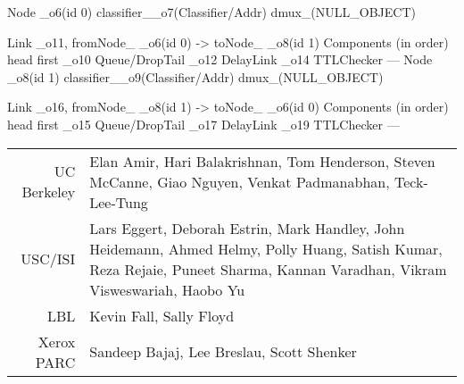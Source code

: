 \documentclass[landscape]{foils}
\begin{document}
\begin{program}
Node _o6(id 0)
                classifier__o7(Classifier/Addr)
                dmux_(NULL_OBJECT)

        Link _o11, fromNode_ _o6(id 0) -> toNode_ _o8(id 1)
        Components (in order) head first
                _o10    Queue/DropTail
                _o12    DelayLink
                _o14    TTLChecker
---
Node _o8(id 1)
                classifier__o9(Classifier/Addr)
                dmux_(NULL_OBJECT)

        Link _o16, fromNode_ _o8(id 1) -> toNode_ _o6(id 0)
        Components (in order) head first
                _o15    Queue/DropTail
                _o17    DelayLink
                _o19    TTLChecker
---
%
\end{program}

\begin{comment}
\item simple topology of two nodes and one link to illustrate
\end{comment}

{\small\renewcommand{\arraystretch}{3}
\begin{tabularx}{\linewidth}{rX}
UC Berkeley & Elan Amir, Hari Balakrishnan,
        Tom Henderson,
        Steven McCanne,
        Giao Nguyen,
        Venkat Padmanabhan, 
        Teck-Lee-Tung \\
USC/ISI & Lars Eggert, Deborah Estrin,
        Mark Handley, John Heidemann, Ahmed Helmy, Polly Huang,
        Satish Kumar, Reza Rejaie, Puneet Sharma,
        Kannan Varadhan, Vikram Visweswariah, Haobo Yu \\
LBL & Kevin Fall, Sally Floyd \\
Xerox PARC & Sandeep Bajaj, Lee Breslau, Scott Shenker \\
\end{tabularx}
}

\begin{comment}
\item foo
\end{comment}
\end{document}
